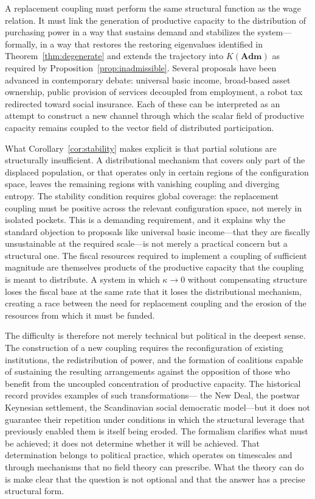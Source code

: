 \documentclass[11pt, a4paper]{article}
\theoremstyle{plain}
\theoremstyle{definition}
\newcommand{\Adm}{\mathbf{Adm}}
\newcommand{\KES}{K}
\newcommand{\coupling}{\kappa}
\begin{document}
A replacement coupling must perform the same structural function as the wage
relation. It must link the generation of productive capacity to the
distribution of purchasing power in a way that sustains demand and stabilizes
the system---formally, in a way that restores the restoring eigenvalues
identified in Theorem~\ref{thm:degenerate} and extends the trajectory into
$\KES(\Adm)$ as required by Proposition~\ref{prop:inadmissible}. Several
proposals have been advanced in contemporary debate: universal basic income,
broad-based asset ownership, public provision of services decoupled from
employment, a robot tax redirected toward social insurance. Each of these can
be interpreted as an attempt to construct a new channel through which the
scalar field of productive capacity remains coupled to the vector field of
distributed participation.

What Corollary~\ref{cor:stability} makes explicit is that partial solutions
are structurally insufficient. A distributional mechanism that covers only
part of the displaced population, or that operates only in certain regions
of the configuration space, leaves the remaining regions with vanishing
coupling and diverging entropy. The stability condition requires global
coverage: the replacement coupling must be positive across the relevant
configuration space, not merely in isolated pockets. This is a demanding
requirement, and it explains why the standard objection to proposals like
universal basic income---that they are fiscally unsustainable at the required
scale---is not merely a practical concern but a structural one. The fiscal
resources required to implement a coupling of sufficient magnitude are
themselves products of the productive capacity that the coupling is meant
to distribute. A system in which $\coupling \to 0$ without compensating
structure loses the fiscal base at the same rate that it loses the
distributional mechanism, creating a race between the need for replacement
coupling and the erosion of the resources from which it must be funded.

The difficulty is therefore not merely technical but political in the deepest
sense. The construction of a new coupling requires the reconfiguration of
existing institutions, the redistribution of power, and the formation of
coalitions capable of sustaining the resulting arrangements against the
opposition of those who benefit from the uncoupled concentration of productive
capacity. The historical record provides examples of such transformations---
the New Deal, the postwar Keynesian settlement, the Scandinavian social
democratic model---but it does not guarantee their repetition under conditions
in which the structural leverage that previously enabled them is itself being
eroded. The formalism clarifies what must be achieved; it does not determine
whether it will be achieved. That determination belongs to political practice,
which operates on timescales and through mechanisms that no field theory can
prescribe. What the theory can do is make clear that the question is not
optional and that the answer has a precise structural form.
\end{document}
